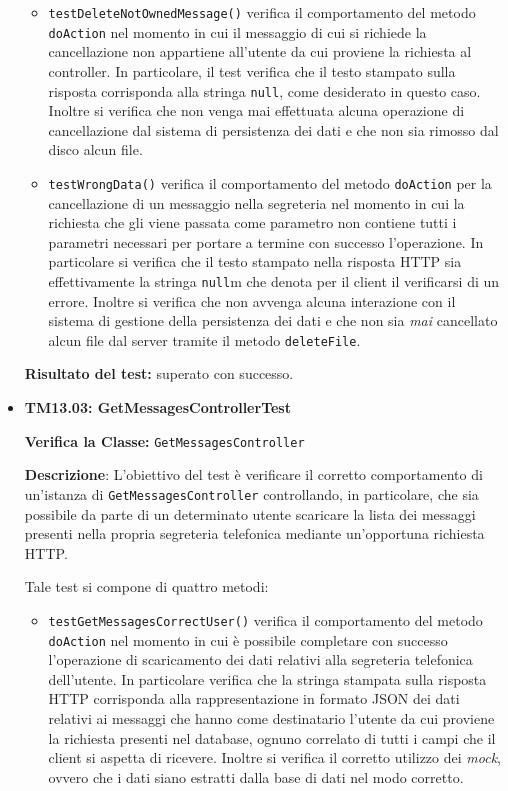 \begin{itemize}
\begin{itemize}
\item \texttt{testDeleteNotOwnedMessage()} verifica il comportamento del metodo \texttt{doAction} nel momento in cui il messaggio di cui si richiede la cancellazione non appartiene all'utente da cui proviene la richiesta al controller. In particolare, il test verifica che il testo stampato sulla risposta corrisponda alla stringa \texttt{null}, come desiderato in questo caso. Inoltre si verifica che non venga mai effettuata alcuna operazione di cancellazione dal sistema di persistenza dei dati e che non sia rimosso dal disco alcun file.

\item \texttt{testWrongData()} verifica il comportamento del metodo \texttt{doAction} per la cancellazione di un messaggio nella segreteria nel momento in cui la richiesta che gli viene passata come parametro non contiene tutti i parametri necessari per portare a termine con successo l'operazione. In particolare si verifica che il testo stampato nella risposta HTTP sia effettivamente la stringa \texttt{null}m che denota per il client il verificarsi di un errore. Inoltre si verifica che non avvenga alcuna interazione con il sistema di gestione della persistenza dei dati e che non sia \textit{mai} cancellato alcun file dal server tramite il metodo \texttt{deleteFile}.

\end{itemize}
\textbf{Risultato del test:} superato con successo.

\item \textbf{TM13.03: GetMessagesControllerTest}

\textbf{Verifica la Classe:} \texttt{GetMessagesController}

\textbf{Descrizione}: L'obiettivo del test è verificare il corretto comportamento di un'istanza di \texttt{GetMessagesController} controllando, in particolare, che sia possibile da parte di un determinato utente scaricare la lista dei messaggi presenti nella propria segreteria telefonica mediante un'opportuna richiesta HTTP\@.

Tale test si compone di quattro metodi:
\begin{itemize}
\item \texttt{testGetMessagesCorrectUser()} verifica il comportamento del metodo \texttt{doAction} nel momento in cui è possibile completare con successo l'operazione di scaricamento dei dati relativi alla segreteria telefonica dell'utente. In particolare verifica che la stringa stampata sulla risposta HTTP corrisponda alla rappresentazione in formato JSON dei dati relativi ai messaggi che hanno come destinatario l'utente da cui proviene la richiesta presenti nel database, ognuno correlato di tutti i campi che il client si aspetta di ricevere. Inoltre si verifica il corretto utilizzo dei \textit{mock}, ovvero che i dati siano estratti dalla base di dati nel modo corretto.


\end{itemize}
\end{itemize}
